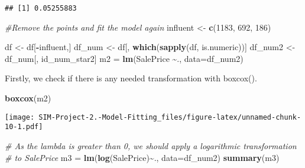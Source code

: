 \documentclass[
]{article}
\newenvironment{Shaded}{\begin{snugshade}}{\end{snugshade}}
\newcommand{\AttributeTok}[1]{\textcolor[rgb]{0.13,0.29,0.53}{#1}}
\newcommand{\CommentTok}[1]{\textcolor[rgb]{0.56,0.35,0.01}{\textit{#1}}}
\newcommand{\DecValTok}[1]{\textcolor[rgb]{0.00,0.00,0.81}{#1}}
\newcommand{\FunctionTok}[1]{\textcolor[rgb]{0.13,0.29,0.53}{\textbf{#1}}}
\newcommand{\NormalTok}[1]{#1}
\newcommand{\OtherTok}[1]{\textcolor[rgb]{0.56,0.35,0.01}{#1}}
\newcommand{\SpecialCharTok}[1]{\textcolor[rgb]{0.81,0.36,0.00}{\textbf{#1}}}
\begin{document}
\begin{verbatim}
## [1] 0.05255883
\end{verbatim}

\begin{Shaded}
\begin{Highlighting}[]
\CommentTok{\#Remove the points and fit the model again}
\NormalTok{influent }\OtherTok{\textless{}{-}} \FunctionTok{c}\NormalTok{(}\DecValTok{1183}\NormalTok{, }\DecValTok{692}\NormalTok{, }\DecValTok{186}\NormalTok{)}

\NormalTok{df }\OtherTok{\textless{}{-}}\NormalTok{ df[}\SpecialCharTok{{-}}\NormalTok{influent,]}
\NormalTok{df\_num }\OtherTok{\textless{}{-}}\NormalTok{ df[, }\FunctionTok{which}\NormalTok{(}\FunctionTok{sapply}\NormalTok{(df, is.numeric))]}
\NormalTok{df\_num2 }\OtherTok{\textless{}{-}}\NormalTok{ df\_num[, id\_num\_star2]}
\NormalTok{m2 }\OtherTok{=} \FunctionTok{lm}\NormalTok{(SalePrice }\SpecialCharTok{\textasciitilde{}}\NormalTok{., }\AttributeTok{data=}\NormalTok{df\_num2)}
\end{Highlighting}
\end{Shaded}

Firstly, we check if there is any needed transformation with boxcox().

\begin{Shaded}
\begin{Highlighting}[]
\FunctionTok{boxcox}\NormalTok{(m2)}
\end{Highlighting}
\end{Shaded}

\texttt{[image: SIM-Project-2.-Model-Fitting\_files/figure-latex/unnamed-chunk-10-1.pdf]}

\begin{Shaded}
\begin{Highlighting}[]
\CommentTok{\# As the lambda is greater than 0, we should apply a logarithmic transformation}
\CommentTok{\# to SalePrice}
\NormalTok{m3 }\OtherTok{=} \FunctionTok{lm}\NormalTok{(}\FunctionTok{log}\NormalTok{(SalePrice)}\SpecialCharTok{\textasciitilde{}}\NormalTok{., }\AttributeTok{data=}\NormalTok{df\_num2)}
\FunctionTok{summary}\NormalTok{(m3)}
\end{Highlighting}
\end{Shaded}
\end{document}
